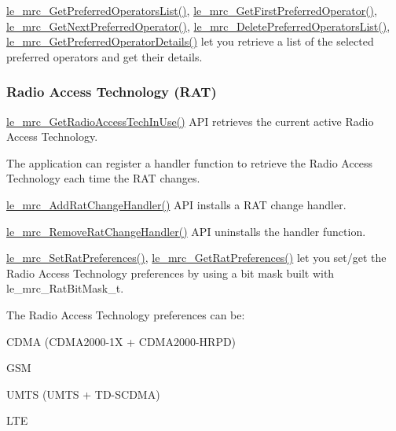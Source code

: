 \hyperlink{le__mrc__interface_8h_a1ea0d2943accd51d3b428e0e6c94d297}{le\+\_\+mrc\+\_\+\+Get\+Preferred\+Operators\+List()}, \hyperlink{le__mrc__interface_8h_a9648b653b7551cd065ec323b96a0aa1b}{le\+\_\+mrc\+\_\+\+Get\+First\+Preferred\+Operator()}, \hyperlink{le__mrc__interface_8h_a896703cabaacf97a70708d944cfbfc87}{le\+\_\+mrc\+\_\+\+Get\+Next\+Preferred\+Operator()}, \hyperlink{le__mrc__interface_8h_a60679f563ffecc8f107425b806edcdf0}{le\+\_\+mrc\+\_\+\+Delete\+Preferred\+Operators\+List()}, \hyperlink{le__mrc__interface_8h_ab2204081bc04a108194e1dd915c35acf}{le\+\_\+mrc\+\_\+\+Get\+Preferred\+Operator\+Details()} let you retrieve a list of the selected preferred operators and get their details.\hypertarget{c_mrc_le_mrc_rat}{}\subsubsection{Radio Access Technology (\+R\+A\+T)}\label{c_mrc_le_mrc_rat}
\hyperlink{le__mrc__interface_8h_a3ad9533c467cec0902d5d165bb32d67b}{le\+\_\+mrc\+\_\+\+Get\+Radio\+Access\+Tech\+In\+Use()} A\+P\+I retrieves the current active Radio Access Technology.

The application can register a handler function to retrieve the Radio Access Technology each time the R\+A\+T changes.

\hyperlink{le__mrc__interface_8h_aedd9c526588a8298322525cfba6f875d}{le\+\_\+mrc\+\_\+\+Add\+Rat\+Change\+Handler()} A\+P\+I installs a R\+A\+T change handler.

\hyperlink{le__mrc__interface_8h_aed4f1730c99a1a9204a198e3df3cf6f5}{le\+\_\+mrc\+\_\+\+Remove\+Rat\+Change\+Handler()} A\+P\+I uninstalls the handler function.

\hyperlink{le__mrc__interface_8h_a2d4abd391bc69c218538f5d8e1be4e01}{le\+\_\+mrc\+\_\+\+Set\+Rat\+Preferences()}, \hyperlink{le__mrc__interface_8h_ae9fa8655738c63e392c8dcc862bdb1d5}{le\+\_\+mrc\+\_\+\+Get\+Rat\+Preferences()} let you set/get the Radio Access Technology preferences by using a bit mask built with {\ttfamily le\+\_\+mrc\+\_\+\+Rat\+Bit\+Mask\+\_\+t}.

The Radio Access Technology preferences can be\+:
\begin{DoxyItemize}
\item C\+D\+M\+A (C\+D\+M\+A2000-\/1\+X + C\+D\+M\+A2000-\/\+H\+R\+P\+D)
\item G\+S\+M
\item U\+M\+T\+S (U\+M\+T\+S + T\+D-\/\+S\+C\+D\+M\+A)
\item L\+T\+E
\end{DoxyItemize}

